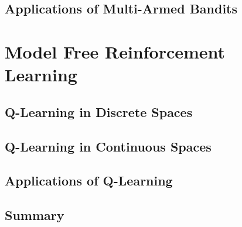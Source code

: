 \documentclass[11pt]{article}
\theoremstyle{definition}
\begin{document}
\subsection{Applications of Multi-Armed Bandits}\label{sec:applications-of-multi-armed-bandits}

\section{Model Free Reinforcement Learning}
\subsection{Q-Learning in Discrete Spaces}\label{sec:q-learning}
\subsection{Q-Learning in Continuous Spaces}\label{sec:q-learning-continuous}
\subsection{Applications of Q-Learning}\label{sec:applications-of-q-learning}
\subsection{Summary}

\clearpage

\end{document}
